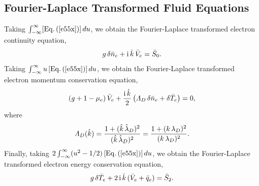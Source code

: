 \documentclass[12pt,prb,aps]{revtex4-1}
\begin{document}
\subsection{Fourier-Laplace Transformed Fluid Equations}
Taking $\int_{-\infty}^\infty [{\rm Eq}.\,(\ref{e55x})]\,du$, we obtain the Fourier-Laplace transformed electron continuity equation,
\begin{equation}\label{e34}
g\,\delta\bar{n}_e+{\rm i}\,\hat{k}\,\bar{V}_e =\bar{S}_0.
\end{equation}
Taking $\int_{-\infty}^\infty u\,[{\rm Eq}.\,(\ref{e55x})]\,du$, we obtain the Fourier-Laplace transformed electron momentum conservation equation,
\begin{equation}\label{e35}
(g+1-\mu_e)\,\bar{V}_e +\frac{{\rm i}\,\hat{k}}{2}\left({\mit\Lambda}_D\,\delta\bar{n}_e+\delta\bar{T}_e\right)=0,
\end{equation}
where
\begin{equation}
{\mit\Lambda}_D (\hat{k})= \frac{1+(\hat{k}\,\hat{\lambda}_D)^2}{(\hat{k}\,\hat{\lambda}_D)^2}= \frac{1+(k\,\lambda_D)^2}{(k\,\lambda_D)^2}.
\end{equation}
Finally, taking $2\int_{-\infty}^\infty(u^2-1/2)\,[{\rm Eq}.\,(\ref{e55x})]\,du$, we obtain the Fourier-Laplace transformed electron energy conservation equation,
\begin{equation}\label{e36}
g\,\delta\bar{T}_e+ 2\,{\rm i}\,\hat{k}\,(\bar{V}_e+\bar{q}_e) =\bar{S}_2.
\end{equation}
\end{document}
